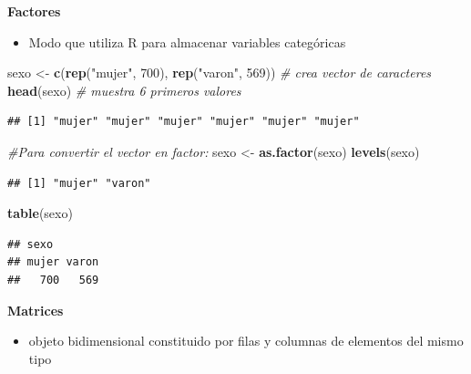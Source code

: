 \documentclass[]{article}
\newenvironment{Shaded}{\begin{snugshade}}{\end{snugshade}}
\newcommand{\CommentTok}[1]{\textcolor[rgb]{0.56,0.35,0.01}{\textit{#1}}}
\newcommand{\DecValTok}[1]{\textcolor[rgb]{0.00,0.00,0.81}{#1}}
\newcommand{\KeywordTok}[1]{\textcolor[rgb]{0.13,0.29,0.53}{\textbf{#1}}}
\newcommand{\NormalTok}[1]{#1}
\newcommand{\StringTok}[1]{\textcolor[rgb]{0.31,0.60,0.02}{#1}}
\providecommand{\tightlist}{%
  \setlength{\itemsep}{0pt}\setlength{\parskip}{0pt}}
\begin{document}
\textbf{Factores}

\begin{itemize}
\tightlist
\item
  Modo que utiliza R para almacenar variables categóricas
\end{itemize}

\begin{Shaded}
\begin{Highlighting}[]
\NormalTok{sexo <-}\StringTok{ }\KeywordTok{c}\NormalTok{(}\KeywordTok{rep}\NormalTok{(}\StringTok{"mujer"}\NormalTok{, }\DecValTok{700}\NormalTok{), }\KeywordTok{rep}\NormalTok{(}\StringTok{"varon"}\NormalTok{, }\DecValTok{569}\NormalTok{)) }\CommentTok{# crea vector de caracteres}
\KeywordTok{head}\NormalTok{(sexo)  }\CommentTok{# muestra 6 primeros valores}
\end{Highlighting}
\end{Shaded}

\begin{verbatim}
## [1] "mujer" "mujer" "mujer" "mujer" "mujer" "mujer"
\end{verbatim}

\begin{Shaded}
\begin{Highlighting}[]
\CommentTok{#Para convertir el vector en factor:}
\NormalTok{sexo <-}\StringTok{ }\KeywordTok{as.factor}\NormalTok{(sexo)}
\KeywordTok{levels}\NormalTok{(sexo)}
\end{Highlighting}
\end{Shaded}

\begin{verbatim}
## [1] "mujer" "varon"
\end{verbatim}

\begin{Shaded}
\begin{Highlighting}[]
\KeywordTok{table}\NormalTok{(sexo)}
\end{Highlighting}
\end{Shaded}

\begin{verbatim}
## sexo
## mujer varon 
##   700   569
\end{verbatim}

\textbf{Matrices}

\begin{itemize}
\tightlist
\item
  objeto bidimensional constituido por filas y columnas de elementos del
  mismo tipo
\end{itemize}
\end{document}

